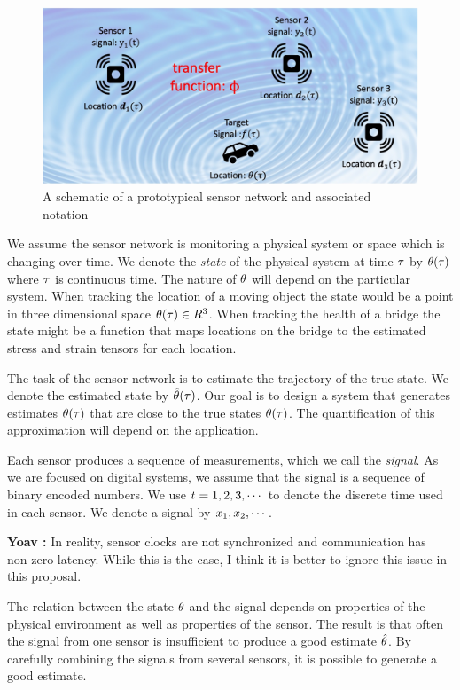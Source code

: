 \documentclass{article}
\newcommand{\comment}[3]{{\color{#1} {\bf #2 :} #3}}
\newcommand{\yoav}[1]{\comment{magenta}{Yoav}{#1}}
\begin{document}
\begin{figure}[t]
\centering
\includegraphics[width=0.9\columnwidth]{figs/Framework.jpg}
\caption{A schematic of a prototypical sensor network and associated
  notation\label{fig:prototypicalSensorNetwork}}
\end{figure}

We assume the sensor network is monitoring a physical system or space which is changing over time. We denote the {\em state} of the physical system at time $\tau$ by $\theta(\tau)$ where $\tau$ is continuous time. The nature of $\theta$ will depend on the particular system. When tracking the location of a moving object the state would be a point in three dimensional space $\theta(\tau) \in R^3$. When tracking the health of a bridge the state might be a function that maps locations on the bridge to the estimated stress and strain tensors for each location.

The task of the sensor network is to estimate the trajectory of the true state. We denote the estimated state by $\hat{\theta}(\tau)$. Our goal is to design a system that generates estimates $\theta(\tau)$ that are close to the true states $\theta(\tau)$. The quantification of this approximation will depend on the application.

Each sensor produces a sequence of measurements, which we call the {\em signal}. As we are focused on digital systems, we assume that the signal is a sequence of binary encoded numbers. We use $t =1,2,3,\cdots$ to denote the discrete time used in each sensor. We denote a signal by $x_1,x_2,\cdots$.

\yoav{In reality, sensor clocks are not synchronized and communication has non-zero latency. While this is the case, I think it is better to ignore this issue in this proposal.}

The relation between the state $\theta$ and the signal depends on properties of the physical environment as well as properties of the sensor. The result is that often the signal from one sensor is insufficient to produce a good estimate $\hat{\theta}$. By carefully combining the signals from several sensors, it is possible to generate a good estimate.
\end{document}
